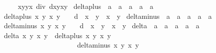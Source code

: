 \begin{isabellebody}
\ \ \ \ \ {\isacharparenleft}x{}{\isacharasterisk}y{}{\isacharplus}y{}{\isacharasterisk}x{}{\isacharparenright}\ div\ {\isacharparenleft}{}{\isacharplus}d{\isacharasterisk}x{}{\isacharasterisk}y{}{\isacharasterisk}x{}{\isacharasterisk}y{}{\isacharparenright}{\isacharparenright}{\isachardoublequoteclose}\isanewline
\isanewline
{}\isamarkupfalse%
\ delta{\isacharunderscore}plus\ {\isacharcolon}{\isacharcolon}\ {\isachardoublequoteopen}{\isacharprime}a\ {\isasymRightarrow}\ {\isacharprime}a\ {\isasymRightarrow}\ {\isacharprime}a\ {\isasymRightarrow}\ {\isacharprime}a\ {\isasymRightarrow}\ {\isacharprime}a{\isachardoublequoteclose}\ \isanewline
\ {\isachardoublequoteopen}delta{\isacharunderscore}plus\ x{}\ y{}\ x{}\ y{}\ {\isacharequal}\ {}\ {\isacharplus}\ d\ {\isacharasterisk}\ x{}\ {\isacharasterisk}\ y{}\ {\isacharasterisk}\ x{}\ {\isacharasterisk}\ y{}{\isachardoublequoteclose}\isanewline
\isanewline
{}\isamarkupfalse%
\ delta{\isacharunderscore}minus\ {\isacharcolon}{\isacharcolon}\ {\isachardoublequoteopen}{\isacharprime}a\ {\isasymRightarrow}\ {\isacharprime}a\ {\isasymRightarrow}\ {\isacharprime}a\ {\isasymRightarrow}\ {\isacharprime}a\ {\isasymRightarrow}\ {\isacharprime}a{\isachardoublequoteclose}\ \isanewline
\ {\isachardoublequoteopen}delta{\isacharunderscore}minus\ x{}\ y{}\ x{}\ y{}\ {\isacharequal}\ {}\ {\isacharminus}\ d\ {\isacharasterisk}\ x{}\ {\isacharasterisk}\ y{}\ {\isacharasterisk}\ x{}\ {\isacharasterisk}\ y{}{\isachardoublequoteclose}\isanewline
\isanewline
{}\isamarkupfalse%
\ delta\ {\isacharcolon}{\isacharcolon}\ {\isachardoublequoteopen}{\isacharprime}a\ {\isasymRightarrow}\ {\isacharprime}a\ {\isasymRightarrow}\ {\isacharprime}a\ {\isasymRightarrow}\ {\isacharprime}a\ {\isasymRightarrow}\ {\isacharprime}a{\isachardoublequoteclose}\ \isanewline
\ {\isachardoublequoteopen}delta\ x{}\ y{}\ x{}\ y{}\ {\isacharequal}\ {\isacharparenleft}delta{\isacharunderscore}plus\ x{}\ y{}\ x{}\ y{}{\isacharparenright}\ {\isacharasterisk}\ \isanewline
\ \ \ \ \ \ \ \ \ \ \ \ \ \ \ \ \ \ \ \ \ \ {\isacharparenleft}delta{\isacharunderscore}minus\ x{}\ y{}\ x{}\ y{}{\isacharparenright}{\isachardoublequoteclose}\isanewline

\end{isabellebody}

